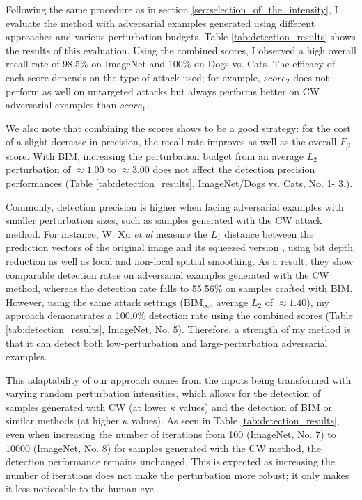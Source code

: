 Following the same procedure as in section \ref{sec:selection_of_the_intensity},
I evaluate the method with adversarial examples generated using different
approaches and various perturbation budgets. Table \ref{tab:detection_results}
shows the results of this evaluation. Using the combined scores, I observed a
high overall recall rate of 98.5\% on ImageNet and 100\% on Dogs vs. Cats. The
efficacy of each score depends on the type of attack used; for example,
$score_2$ does not perform as well on untargeted attacks but always performs
better on CW adversarial examples than $score_1$.

We also note that combining the scores shows to be a good strategy: for the cost
of a slight decrease in precision, the recall rate improves as well as the
overall $F_{\beta}$ score. With BIM, increasing the perturbation budget from an
average $L_2$ perturbation of $\approx 1.00$ to $\approx 3.00$ does not affect
the detection precision performances (Table \ref{tab:detection_results},
ImageNet/Dogs vs. Cats, No. 1- 3.).

Commonly, detection precision is higher when facing adversarial examples with
smaller perturbation sizes, such as samples generated with the CW attack method.
For instance, W. Xu \emph{et al} measure the $L_1$ distance between the
prediction vectors of the original image and its squeezed version
\cite{xu_feature_2018}, using bit depth reduction as well as local and non-local
spatial smoothing. As a result, they show comparable detection rates on
adversarial examples generated with the CW method, whereas the detection rate
falls to 55.56\% on samples crafted with BIM. However, using the same attack
settings (BIM$_\infty$, average $L_2$ of $\approx 1.40$), my approach
demonstrates a 100.0\% detection rate using the combined scores (Table
\ref{tab:detection_results}, ImageNet, No. 5). Therefore, a strength of my
method is that it can detect both low-perturbation and large-perturbation
adversarial examples.

This adaptability of our approach comes from the inputs being transformed with
varying random perturbation intensities, which allows for the detection of
samples generated with CW (at lower $\kappa$ values) and the detection of BIM or
similar methods (at higher $\kappa$ values). As seen in Table
\ref{tab:detection_results}, even when increasing the number of iterations from
100 (ImageNet, No. 7) to 10000 (ImageNet, No. 8) for samples generated with the
CW method, the detection performance remains unchanged. This is expected as
increasing the number of iterations does not make the perturbation more robust;
it only makes it less noticeable to the human eye.

